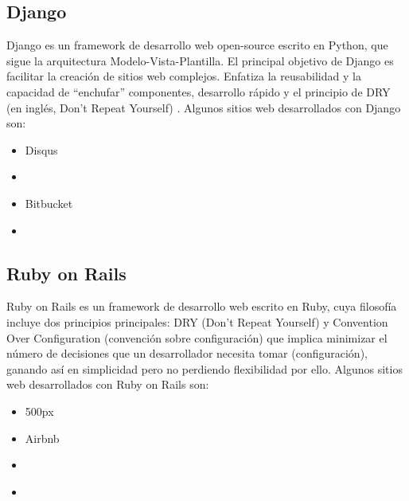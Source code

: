 \subsection{Django}
Django es un framework de desarrollo web open-source escrito en Python, que sigue la arquitectura Modelo-Vista-Plantilla. El principal objetivo de Django es facilitar la creación de sitios web complejos. Enfatiza la reusabilidad y la capacidad de “enchufar” componentes, desarrollo rápido y el principio de DRY (en  inglés, Don’t Repeat Yourself) \parencite{Holovaty2009-jr}. Algunos sitios web desarrollados con Django son:
\begin{itemize}
    \item Disqus \parencite{Robenolt2013-cb}
    \item \cite{Instagram2016-cp}
    \item Bitbucket \parencite{Django2012-bt}
    \item \cite{OpenStack2016-vh}
\end{itemize}

\subsection{Ruby on Rails}
Ruby on Rails es un framework de desarrollo web escrito en Ruby, cuya filosofía incluye dos principios principales: DRY (Don’t Repeat Yourself) y Convention Over Configuration (convención sobre configuración) que implica minimizar el número de decisiones que un desarrollador necesita tomar (configuración), ganando así en simplicidad pero no perdiendo flexibilidad por ello.
Algunos sitios web desarrollados con Ruby on Rails son:
\begin{itemize}
    \item 500px \parencite{Liu2015-dx}
    \item Airbnb \parencite{Weksler2015-ip}
    \item \cite{GitHub2009-gt}
    \item \cite{Bloomberg2012-ue}
\end{itemize}
